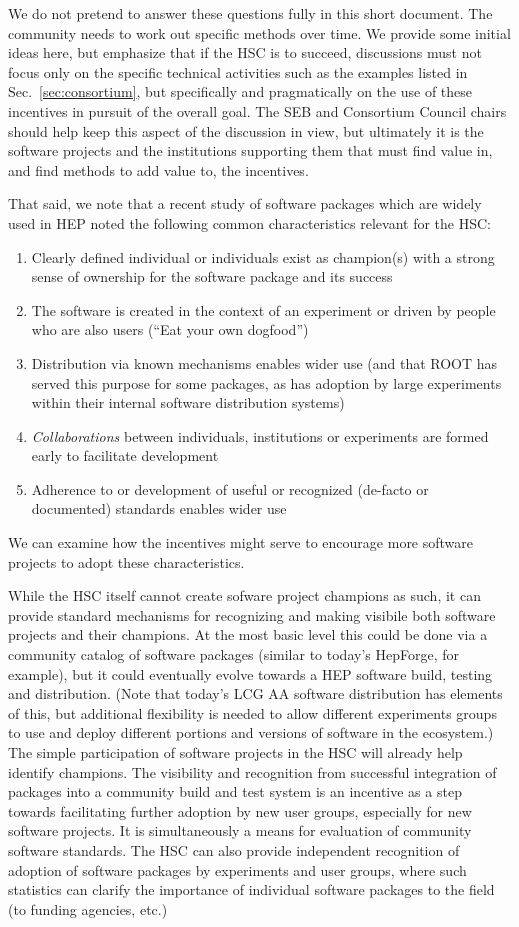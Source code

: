\documentclass[12pt,letterpaper,fleqn]{article}
\begin{document}
We do not pretend to answer these questions fully in this short
document. The community needs to work out specific methods over time. 
We provide some initial ideas here, but emphasize that if the HSC is to 
succeed, discussions must not focus only on the specific technical 
activities such as the examples listed in Sec.~\ref{sec:consortium}, but 
specifically and pragmatically on the use of these incentives in pursuit 
of the 
overall goal. The SEB and Consortium Council chairs should help keep
this aspect of the discussion in view, but ultimately it is the software 
projects and the institutions supporting them that must find value in,
and find methods to add value to, the incentives.

That said, we note that a recent study of software packages which are 
widely used in HEP noted the following common characteristics relevant 
for the HSC:
\begin{enumerate}
\item Clearly defined individual or individuals exist as champion(s)
with a strong sense of ownership for the software package and its success
\item The software is created in the context of an experiment or
driven by people who are also users (``Eat your own dogfood'')
\item Distribution via known mechanisms enables wider use (and that ROOT 
has served this purpose for some packages, as has adoption by large
experiments within their internal software distribution systems)
\item {\em Collaborations} between individuals, institutions or
experiments are formed early to facilitate development
\item Adherence to or development of useful or recognized (de-facto
or documented) standards enables wider use
\end{enumerate}
We can examine how the incentives might serve to encourage more software 
projects to adopt these characteristics.

While the HSC itself cannot create sofware project champions as such, 
it can provide standard mechanisms for recognizing and making
visibile both software projects and their champions.
At the most basic level this could be done via a community catalog
of software packages (similar to today's HepForge, for example), but
it could eventually evolve towards a HEP software build, testing 
and distribution. (Note that today's LCG AA software distribution has 
elements of this, but additional flexibility is needed to allow different
experiments groups to use and deploy different portions and versions of
software in the ecosystem.) The simple participation of software 
projects in the HSC will already help identify champions. The visibility 
and recognition from successful integration of packages into a community 
build and test system is an incentive as a step towards facilitating
further adoption by new user groups, especially for new software projects. 
It is simultaneously a means for evaluation of community software 
standards. The HSC can also provide independent recognition of adoption 
of software packages by experiments and user groups, where such statistics
can clarify the importance of individual software packages to the field
(to funding agencies, etc.)
\end{document}
